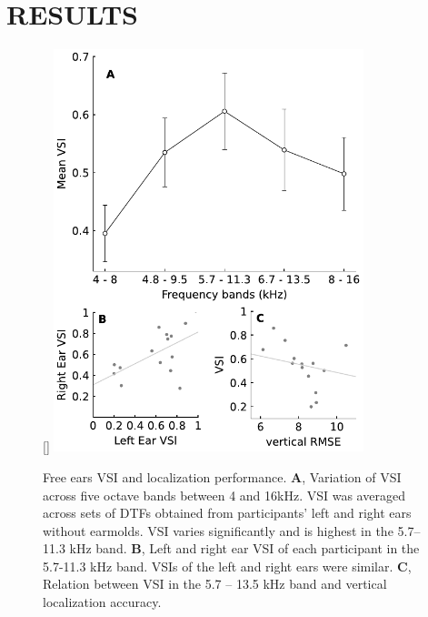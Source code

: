 \newpage\section{RESULTS}\label{sec3}%
\begin{figure}
\captionsetup{width=9cm}
\centering
    \raisebox{0pt}[\dimexpr{}\baselineskip\relax]{
        \includegraphics[width=9cm]{../Results/figures/fig2/fig2}}
	\caption{Free ears VSI and localization performance. \textbf{A}, Variation of VSI across five octave bands between 4 and 16kHz. VSI was averaged across sets of DTFs obtained from participants' left and right ears without earmolds. VSI varies significantly and is highest in the 5.7–11.3 kHz band.  \textbf{B}, Left and right ear VSI of each participant in the 5.7-11.3 kHz band. VSIs of the left and right ears were similar. \textbf{C}, Relation between VSI in the 5.7 – 13.5 kHz band and vertical localization accuracy.}
	\label{fig:ef_vsi}
\end{figure}

\noindent\vspace{-3\baselineskip}
